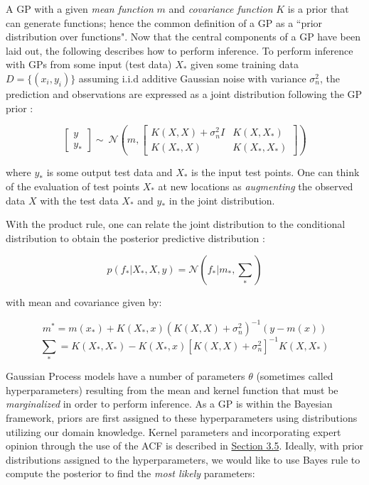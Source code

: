 A GP with a given \textit{mean function} $m$ and \textit{covariance function} $K$ is a prior that can generate functions; hence the common definition of a GP as a ``prior distribution over functions". Now that the central components of a GP have been laid out, the following describes how to perform inference. To perform inference with GPs from some input (test data) $X_*$ given some training data $D = \{(x_i, y_i)\}$ assuming i.i.d additive Gaussian noise with variance $\sigma_{n}^2$, the prediction and observations are expressed as a joint distribution following the GP prior \cite{roberts_gaussian_2013}:

\begin{equation}
\begin{bmatrix} 
y \\ 
y_*
\end{bmatrix} 
\sim{~} \mathcal{N} (m, \begin{bmatrix} 
K(X, X) + \sigma_{n}^2I & K(X, X_*) \\
K(X_*, X) & K(X_*, X_*)
\end{bmatrix})
\end{equation}

where $y_*$ is some output test data and $X_*$ is the input test points. One can think of the evaluation of test points $X_*$ at new locations as \textit{augmenting} the observed data $X$ with the test data $X_*$ and $y_*$ in the joint distribution. 

With the product rule, one can relate the joint distribution to the conditional distribution to obtain the posterior predictive distribution \cite{pml1Book}:

\begin{equation}
p(f_* | X_*, X, y) = \mathcal{N}(f_* | m_*, \sum_*)
\end{equation}

with mean and covariance given by:

\begin{equation}
m^* = m(x_*) + K(X_*, x)(K(X, X) + \sigma_{n}^2)^{-1}(y - m(x))
\end{equation}
\begin{equation}
\sum_{*} = K(X_*, X_*) - K(X_*, x)[K(X, X) + \sigma_{n}^2]^{-1}K(X, X_*)
\end{equation}

Gaussian Process models have a number of parameters $\theta$ (sometimes called hyperparameters) resulting from the mean and kernel function that must be \textit{marginalized} in order to perform inference. As a GP is within the Bayesian framework, priors are first assigned to these hyperparameters using distributions utilizing our domain knowledge. Kernel parameters and incorporating expert opinion through the use of the \ac{ACF} is described in \hyperlink{subsection.3.5}{Section 3.5}. Ideally, with prior distributions assigned to the hyperparameters, we would like to use Bayes rule to compute the posterior to find the \textit{most likely} parameters:

